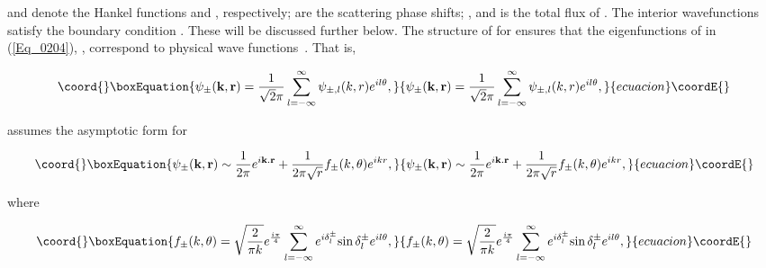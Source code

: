 \documentclass[a4paper,twocolumn,showpacs,preprintnumbers,amsmath,amssymb]{revtex4}
\providecommand{\half}{\frac{1}{2}}
\begin{document}
\noindent
{}\coordHE{} and \coordHE{} denote the Hankel functions \coordHE{}
and \coordHE{}, respectively; \coordHE{} are the
scattering phase shifts; \coordHE{}, and
\coordHE{} is the total flux of \coordHE{}. The interior wavefunctions
\coordHE{} satisfy the boundary condition
\myHighlight{$\lim_{r \to 0} r^{-\half -|l|} R_{\pm, l} = 1$}\coordHE{}. These will be
discussed further below. The structure of \coordHE{} for
\coordHE{} ensures that the eigenfunctions of \coordHE{} in
(\ref{Eq_0204}), \coordHE{},
correspond to physical wave functions~\cite{Newton82}. That is,

\begin{equation}\coord{}\boxEquation{
\label{Eq_0213}
\psi_{\pm}(\mathbf{k}, \mathbf{r})
  = \frac{1}{\sqrt{2}\pi} \sum^{\infty}_{l=-\infty}
  \psi_{\pm,l}(k,r) e^{il \theta},
}{
\psi_{\pm}(\mathbf{k}, \mathbf{r})
  = \frac{1}{\sqrt{2}\pi} \sum^{\infty}_{l=-\infty}
  \psi_{\pm,l}(k,r) e^{il \theta},
}{ecuacion}\coordE{}\end{equation}

\noindent
assumes the asymptotic form for \coordHE{}

\begin{equation}\coord{}\boxEquation{
\label{Eq_0214}
\psi_{\pm}(\mathbf{k}, \mathbf{r})
  \sim \frac{1}{2\pi} e^{i\mathbf{k}.\mathbf{r}}
  + \frac{1}{2\pi\sqrt{r}} f_{\pm}(k, \theta) e^{ikr},
}{
\psi_{\pm}(\mathbf{k}, \mathbf{r})
  \sim \frac{1}{2\pi} e^{i\mathbf{k}.\mathbf{r}}
  + \frac{1}{2\pi\sqrt{r}} f_{\pm}(k, \theta) e^{ikr},
}{ecuacion}\coordE{}\end{equation}

\noindent
where


\begin{equation}\coord{}\boxEquation{
\label{Eq_0215}
f_{\pm}(k, \theta)
  = \sqrt{\frac{2}{\pi k}} e^{\frac{i\pi}{4}}
  \sum^{\infty}_{l = -\infty} e^{i\delta^{\pm}_{l}}
  \text{sin} \, \delta^{\pm}_{l} e^{il \theta}, 
}{
f_{\pm}(k, \theta)
  = \sqrt{\frac{2}{\pi k}} e^{\frac{i\pi}{4}}
  \sum^{\infty}_{l = -\infty} e^{i\delta^{\pm}_{l}}
  \text{sin} \, \delta^{\pm}_{l} e^{il \theta}, 
}{ecuacion}\coordE{}\end{equation}
\end{document}
